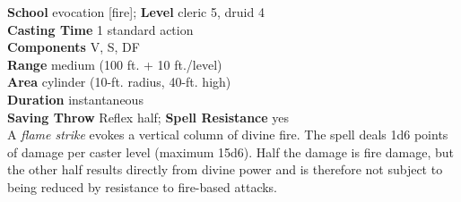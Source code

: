 \textbf{School} evocation [fire]; \textbf{Level} cleric 5, druid 4\\
\textbf{Casting Time} 1 standard action\\
\textbf{Components} V, S, DF\\
\textbf{Range }medium (100 ft. + 10 ft./level)\\
\textbf{Area} cylinder (10-ft. radius, 40-ft. high)\\
\textbf{Duration} instantaneous\\
\textbf{Saving Throw} Reflex half; \textbf{Spell Resistance} yes\\
A \textit{flame strike }evokes a vertical column of divine fire. The spell deals 1d6 points of damage per caster level (maximum 15d6). Half the damage is fire damage, but the other half results directly from divine power and is therefore not subject to being reduced by resistance to fire-based attacks.\\
